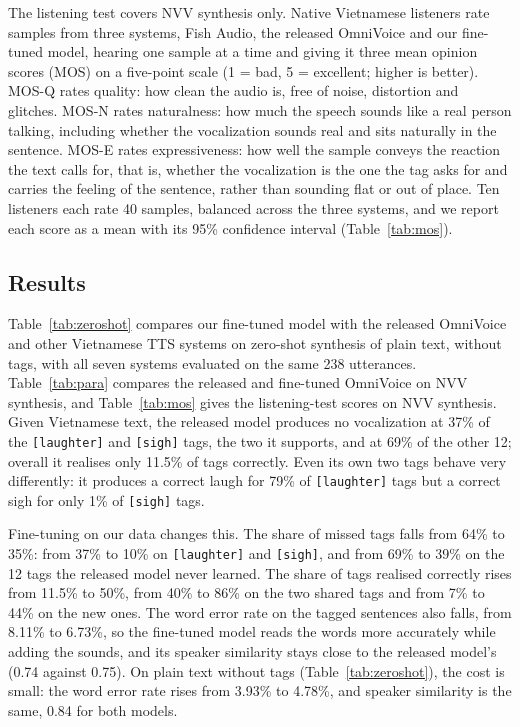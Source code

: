 \documentclass{article} %
\begin{document}
The listening test covers NVV synthesis only. Native Vietnamese listeners rate samples from
three systems, Fish Audio, the released OmniVoice and our fine-tuned model, hearing one sample
at a time and giving it three mean opinion scores (MOS) on a five-point scale (1 = bad,
5 = excellent; higher is better). MOS-Q rates quality: how clean the audio is, free of noise,
distortion and glitches. MOS-N rates naturalness: how much the speech sounds like a real person
talking, including whether the vocalization sounds real and sits naturally in the sentence.
MOS-E rates expressiveness: how well the sample conveys the reaction the text calls for, that
is, whether the vocalization is the one the tag asks for and carries the feeling of the
sentence, rather than sounding flat or out of place. Ten listeners each rate 40 samples,
balanced across the three systems, and we report each score as a mean with its 95\% confidence
interval (Table~\ref{tab:mos}).

\subsection{Results}\label{sec:results}
Table~\ref{tab:zeroshot} compares our fine-tuned model with the released OmniVoice and other
Vietnamese TTS systems on zero-shot synthesis of plain text, without tags, with all seven
systems evaluated on the same 238 utterances. Table~\ref{tab:para} compares
the released and fine-tuned OmniVoice on NVV synthesis, and Table~\ref{tab:mos} gives the
listening-test scores on NVV synthesis. Given Vietnamese text, the released
model produces no vocalization at 37\% of the \texttt{[laughter]} and \texttt{[sigh]} tags, the
two it supports, and at 69\% of the other 12; overall it realises only 11.5\% of tags correctly.
Even its own two tags behave very differently: it produces a correct laugh for 79\% of
\texttt{[laughter]} tags but a correct sigh for only 1\% of \texttt{[sigh]} tags.

Fine-tuning on our data changes this. The share of missed tags falls from 64\% to 35\%: from 37\%
to 10\% on \texttt{[laughter]} and \texttt{[sigh]}, and from 69\% to 39\% on the 12 tags the
released model never learned. The share of tags realised correctly rises from 11.5\% to 50\%,
from 40\% to 86\% on the two shared tags and from 7\% to 44\% on the new ones. The word error rate
on the tagged sentences also falls, from 8.11\% to 6.73\%, so the fine-tuned model reads the words
more accurately while adding the sounds, and its speaker similarity stays close to the released
model's (0.74 against 0.75). On plain text without tags (Table~\ref{tab:zeroshot}), the cost is
small: the word error rate rises from 3.93\% to 4.78\%, and speaker similarity is the same, 0.84
for both models.
\end{document}
